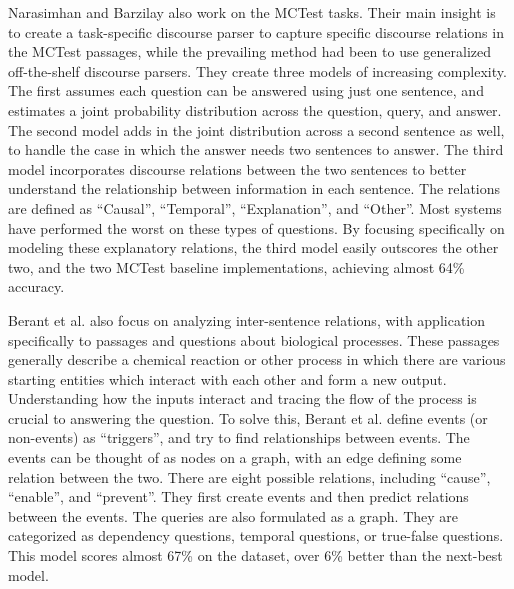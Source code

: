 \documentclass[pageno]{jpaper}
\begin{document}
Narasimhan and Barzilay\cite{Narasimhan2015} also work on the MCTest tasks.
Their main insight is to create a task-specific discourse parser to capture
specific discourse relations in the MCTest passages, while the prevailing
method had been to use generalized off-the-shelf discourse parsers. They create
three models of increasing complexity. The first assumes each question can be
answered using just one sentence, and estimates a joint probability
distribution across the question, query, and answer. The second model adds in
the joint distribution across a second sentence as well, to handle the case in
which the answer needs two sentences to answer. The third model incorporates
discourse relations between the two sentences to better understand the
relationship between information in each sentence. The relations are defined as
``Causal'', ``Temporal'', ``Explanation'', and ``Other''. Most systems have
performed the worst on these types of questions. By focusing specifically on
modeling these explanatory relations, the third model easily outscores the
other two, and the two MCTest baseline implementations, achieving almost 64\%
accuracy.

Berant et al.\cite{Berant2014} also focus on analyzing inter-sentence
relations, with application specifically to passages and questions about
biological processes. These passages generally describe a chemical reaction or
other process in which there are various starting entities which interact with
each other and form a new output. Understanding how the inputs interact and
tracing the flow of the process is crucial to answering the question. To solve
this, Berant et al. define events (or non-events) as ``triggers'', and try to
find relationships between events. The events can be thought of as nodes on a
graph, with an edge defining some relation between the two. There are eight
possible relations, including ``cause'', ``enable'', and ``prevent''. They
first create events and then predict relations between the events. The queries
are also formulated as a graph. They are categorized as dependency questions,
temporal questions, or true-false questions. This model scores almost 67\% on
the dataset, over 6\% better than the next-best model.
\end{document}
